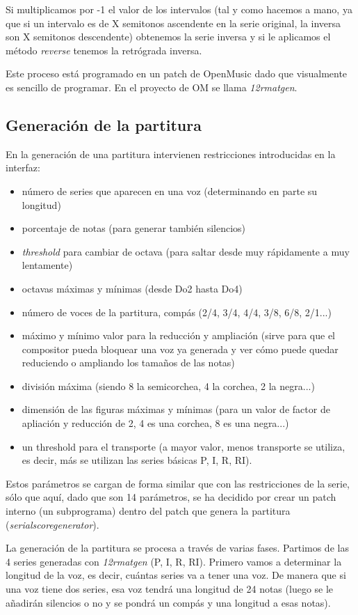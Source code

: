 \documentclass[a4paper,openany,12pt]{memoir}
\begin{document}
Si multiplicamos por -1 el valor de los intervalos (tal y como hacemos a mano, ya que si un intervalo es de X semitonos ascendente en la serie original, la inversa son X semitonos descendente) obtenemos la serie inversa y si le aplicamos el método \emph{reverse} tenemos la retrógrada inversa.

Este proceso está programado en un patch de OpenMusic dado que visualmente es sencillo de programar. En el proyecto de OM se llama \emph{12rmatgen}.

\subsection{Generación de la partitura}
En la generación de una partitura intervienen restricciones introducidas en la interfaz: 
\begin{itemize}
\item número de series que aparecen en una voz (determinando en parte su longitud)
\item porcentaje de notas (para generar también silencios)
\item \emph{threshold} para cambiar de octava (para saltar desde muy rápidamente a muy lentamente)
\item octavas máximas y mínimas (desde Do2 hasta Do4)
\item número de voces de la partitura, compás (2/4, 3/4, 4/4, 3/8, 6/8, 2/1...)
\item máximo y mínimo valor para la reducción y ampliación (sirve para que el compositor pueda bloquear una voz ya generada y ver cómo puede quedar reduciendo o ampliando los tamaños de las notas)
\item división máxima (siendo 8 la semicorchea, 4 la corchea, 2 la negra...)
\item dimensión de las figuras máximas y mínimas (para un valor de factor de apliación y reducción de 2, 4 es una corchea, 8 es una negra...)
\item un threshold para el transporte (a mayor valor, menos transporte se utiliza, es decir, más se utilizan las series básicas P, I, R, RI).
\end{itemize}

Estos parámetros se cargan de forma similar que con las restricciones de la serie, sólo que aquí, dado que son 14 parámetros, se ha decidido por crear un patch interno (un subprograma) dentro del patch que genera la partitura (\emph{serialscoregenerator}).

La generación de la partitura se procesa a través de varias fases. Partimos de las 4 series generadas con \emph{12rmatgen} (P, I, R, RI). Primero vamos a determinar la longitud de la voz, es decir, cuántas series va a tener una voz. De manera que si una voz tiene dos series, esa voz tendrá una longitud de 24 notas (luego se le añadirán silencios o no y se pondrá un compás y una longitud a esas notas).
\end{document}
